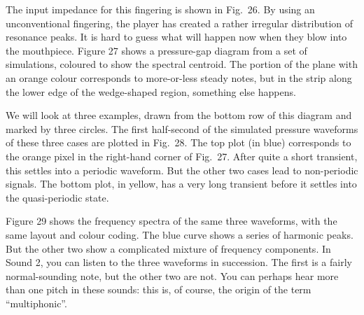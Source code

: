   The input impedance for this fingering is shown in Fig.\ 26. By using an 
  unconventional fingering, the player has created a rather irregular 
  distribution of resonance peaks. It is hard to guess what will happen now 
  when they blow into the mouthpiece. Figure 27 shows a pressure-gap diagram 
  from a set of simulations, coloured to show the spectral centroid. The 
  portion of the plane with an orange colour corresponds to more-or-less steady 
  notes, but in the strip along the lower edge of the wedge-shaped region, 
  something else happens. 


  We will look at three examples, drawn from the bottom row of this diagram and 
  marked by three circles. The first half-second of the simulated pressure 
  waveforms of these three cases are plotted in Fig.\ 28. The top plot (in 
  blue) corresponds to the orange pixel in the right-hand corner of Fig.\ 27. 
  After quite a short transient, this settles into a periodic waveform. But the 
  other two cases lead to non-periodic signals. The bottom plot, in yellow, has 
  a very long transient before it settles into the quasi-periodic state. 


  Figure 29 shows the frequency spectra of the same three waveforms, with the 
  same layout and colour coding. The blue curve shows a series of harmonic 
  peaks. But the other two show a complicated mixture of frequency components. 
  In Sound 2, you can listen to the three waveforms in succession. The first is 
  a fairly normal-sounding note, but the other two are not. You can perhaps 
  hear more than one pitch in these sounds: this is, of course, the origin of 
  the term “multiphonic”. 


